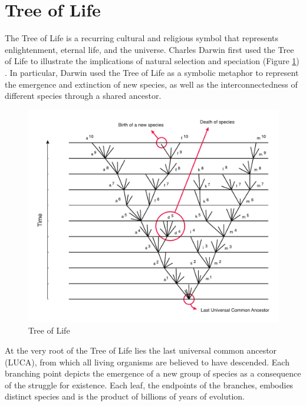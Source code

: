 \section{Tree of Life}

The Tree of Life is a recurring cultural and religious symbol that represents enlightenment, eternal life, and the universe. Charles Darwin first used the Tree of Life to illustrate the implications of natural selection and speciation (Figure \ref{figure:tree-of-life}) \cite{Darwin1859}. In particular, Darwin used the Tree of Life as a symbolic metaphor to represent the emergence and extinction of new species, as well as the interconnectedness of different species through a shared ancestor.


\begin{figure}[htbp!]
\caption{Tree of Life}
\label{figure:tree-of-life}
\begin{centering}
\includegraphics[width=\textwidth]{Vector/tree_of_life.pdf}
\end{centering}
\end{figure}

At the very root of the Tree of Life lies the last universal common ancestor (LUCA), from which all living organisms are believed to have descended. Each branching point depicts the emergence of a new group of species as a consequence of the struggle for existence. Each leaf, the endpoints of the branches, embodies distinct species and is the product of billions of years of evolution. 

